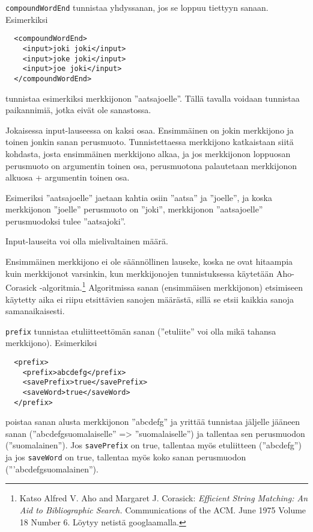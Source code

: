 \documentclass[12pt]{article}
\begin{document}


\bigskip
\verb|compoundWordEnd| tunnistaa yhdyssanan, jos se loppuu tiettyyn sanaan.
Esimerkiksi

\begin{verbatim}
  <compoundWordEnd>
    <input>joki joki</input>
    <input>joke joki</input>
    <input>joe joki</input>
  </compoundWordEnd>
\end{verbatim}

tunnistaa esimerkiksi merkkijonon ''aatsajoelle''. Tällä tavalla
voidaan tunnistaa paikannimiä, jotka eivät ole sanastossa.

Jokaisessa input-lauseessa on kaksi osaa. Ensimmäinen on jokin
merkkijono ja toinen jonkin sanan perusmuoto. Tunnistettaessa
merkkijono katkaistaan siitä kohdasta, josta ensimmäinen merkkijono
alkaa, ja jos merkkijonon loppuosan perusmuoto on argumentin toinen
osa, perusmuotona palautetaan merkkijonon alkuosa + argumentin toinen
osa.

Esimeriksi ''aatsajoelle'' jaetaan kahtia osiin ''aatsa'' ja
''joelle'', ja koska merkkijonon ''joelle'' perusmuoto on ''joki'',
merkkijonon ''aatsajoelle'' perusmuodoksi tulee ''aatsajoki''.

Input-lauseita voi olla mielivaltainen määrä.

Ensimmäinen merkkijono ei ole säännöllinen lauseke, koska ne ovat
hitaampia kuin merkkijonot varsinkin, kun merkkijonojen tunnistuksessa
käytetään Aho-Corasick -algoritmia.\footnote{Katso
Alfred V. Aho and Margaret J. Corasick:
\emph{Efficient String Matching: An Aid to Bibliographic Search.}
Communications of the ACM. June 1975 Volume 18 Number 6.
Löytyy netistä googlaamalla.} Algoritmissa sanan (ensimmäisen
merkkijonon) etsimiseen käytetty aika ei riipu etsittävien sanojen
määrästä, sillä se etsii kaikkia sanoja samanaikaisesti.



\bigskip
\verb|prefix| tunnistaa etuliitteettömän sanan (''etuliite'' voi olla
mikä tahansa merkkijono). Esimerkiksi

\begin{verbatim}
  <prefix>
    <prefix>abcdefg</prefix>
    <savePrefix>true</savePrefix>
    <saveWord>true</saveWord>
  </prefix>
\end{verbatim}

poistaa sanan alusta merkkijonon ''abcdefg'' ja yrittää tunnistaa
jäljelle jääneen sanan (''abcdefgsuomalaiselle'' => ''suomalaiselle'')
ja tallentaa sen perusmuodon (''suomalainen''). Jos \verb|savePrefix|
on true, tallentaa myös etuliitteen (''abcdefg'') ja jos
\verb|saveWord| on true, tallentaa myös koko sanan perusmuodon
('''abcdefgsuomalainen'').
\end{document}
